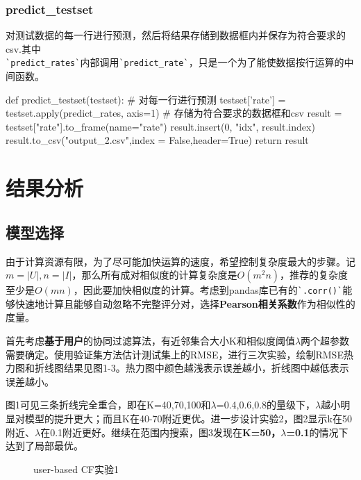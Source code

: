 \documentclass[12pt, a4paper]{ctexart}
\begin{document}
\subsubsection{predict\_testset}
对测试数据的每一行进行预测，然后将结果存储到数据框内并保存为符合要求的csv.其中\\
\verb|`predict_rates`|内部调用\verb|`predict_rate`|，只是一个为了能使数据按行运算的中间函数。

\begin{python}
def predict_testset(testset):  
  # 对每一行进行预测
  testset['rate'] = testset.apply(predict_rates, axis=1)
  # 存储为符合要求的数据框和csv
  result = testset["rate"].to_frame(name="rate")
  result.insert(0, "idx", result.index)
  result.to_csv("output_2.csv",index = False,header=True)
  return result
\end{python}

\section{结果分析}

\subsection{模型选择}

由于计算资源有限，为了尽可能加快运算的速度，希望控制复杂度最大的步骤。记$m=|U|,n=|I|$，那么所有成对相似度的计算复杂度是$O(m^2n)$，推荐的复杂度至少是$O(mn)$，因此要加快相似度的计算。考虑到pandas库已有的\verb|`.corr()`|能够快速地计算且能够自动忽略不完整评分对，选择\textbf{Pearson相关系数}作为相似性的度量。

首先考虑\textbf{基于用户}的协同过滤算法，有近邻集合大小K和相似度阈值$\lambda$两个超参数需要确定。使用验证集方法估计测试集上的RMSE，进行三次实验，绘制RMSE热力图和折线图结果见图1-3。热力图中颜色越浅表示误差越小，折线图中越低表示误差越小。

图1可见三条折线完全重合，即在K=40,70,100和$\lambda$=0.4,0.6,0.8的量级下，$\lambda$越小明显对模型的提升更大；而且K在40-70附近更优。进一步设计实验2，图2显示k在50附近、$\lambda$在0.1附近更好。继续在范围内搜索，图3发现在\textbf{K=50，$\lambda$=0.1}的情况下达到了局部最优。

\begin{figure}[htbp]
    \centering
    \caption{user-based CF实验1}
    \label{fig.1}
\end{figure}
\end{document}
